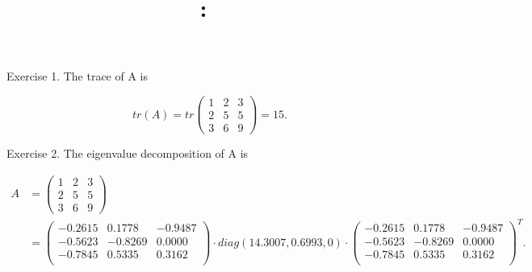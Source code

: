 \documentclass{article}
\date{}
\title{
    \textmd{\textbf{\hmwkClass:\ \hmwkTitle}}\\
}
\author{\hmwkAuthorName}
\begin{document}
\maketitle

\begin{section}{Exercise 1.}
The trace of A is 

$$
tr(A) =tr
\begin{pmatrix}
1 & 2 & 3\\
2 & 5 & 5\\
3 & 6 & 9
\end{pmatrix} = 15.
$$

\end{section}

\begin{section}{Exercise 2.}
The eigenvalue decomposition of A is 

\begin{align*}
A &=
\begin{pmatrix}
1 & 2 & 3\\
2 & 5 & 5\\
3 & 6 & 9
\end{pmatrix}
\\ 
&=
\begin{pmatrix}
  -0.2615  &  0.1778 &  -0.9487\\
  -0.5623 &  -0.8269  &  0.0000\\
  -0.7845 &   0.5335  &  0.3162\\
\end{pmatrix} 
\cdot
diag(14.3007,0.6993,0)
\cdot
\begin{pmatrix}
  -0.2615  &  0.1778 &  -0.9487\\
  -0.5623 &  -0.8269  &  0.0000\\
  -0.7845 &   0.5335  &  0.3162\\
\end{pmatrix}^T.
\end{align*}
\end{section}
\end{document}
